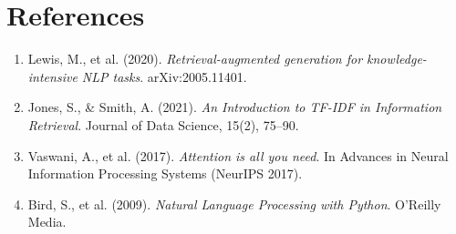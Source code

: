 \documentclass{article}
\begin{document}
\section{References}
\begin{enumerate}
    \item Lewis, M., et al. (2020). \textit{Retrieval-augmented generation for knowledge-intensive NLP tasks}. arXiv:2005.11401.
    \item Jones, S., \& Smith, A. (2021). \textit{An Introduction to TF-IDF in Information Retrieval}. Journal of Data Science, 15(2), 75--90.
    \item Vaswani, A., et al. (2017). \textit{Attention is all you need}. In Advances in Neural Information Processing Systems (NeurIPS 2017).
    \item Bird, S., et al. (2009). \textit{Natural Language Processing with Python}. O'Reilly Media.
\end{enumerate}
\end{document}
